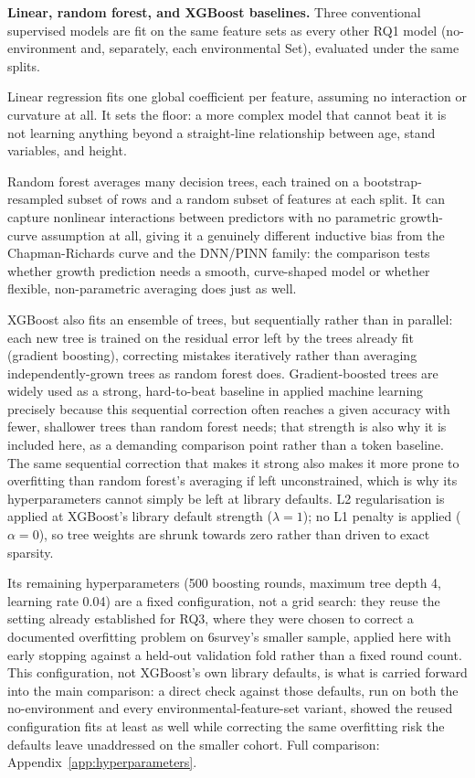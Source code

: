 \documentclass[11pt,a4paper]{report}
\begin{document}
\textbf{Linear, random forest, and XGBoost baselines.} Three conventional supervised models are
fit on the same feature sets as every other RQ1 model (no-environment and, separately, each
environmental Set), evaluated under the same splits.

Linear regression fits one global coefficient per feature, assuming no interaction or curvature at
all. It sets the floor: a more complex model that cannot beat it is not learning anything beyond a
straight-line relationship between age, stand variables, and height.

Random forest averages many decision trees, each trained on a bootstrap-resampled subset of rows
and a random subset of features at each split. It can capture nonlinear interactions between
predictors with no parametric growth-curve assumption at all, giving it a genuinely different
inductive bias from the Chapman-Richards curve and the DNN/PINN family: the comparison tests
whether growth prediction needs a smooth, curve-shaped model or whether flexible, non-parametric
averaging does just as well.

XGBoost also fits an ensemble of trees, but sequentially rather than in parallel: each new tree is
trained on the residual error left by the trees already fit (gradient boosting), correcting
mistakes iteratively rather than averaging independently-grown trees as random forest does.
Gradient-boosted trees are widely used as a strong, hard-to-beat baseline in applied machine
learning precisely because this sequential correction often reaches a given accuracy with fewer,
shallower trees than random forest needs; that strength is also why it is included here, as a
demanding comparison point rather than a token baseline. The same sequential correction that makes
it strong also makes it more prone to overfitting than random forest's averaging if left
unconstrained, which is why its hyperparameters cannot simply be left at library defaults. L2
regularisation is applied at XGBoost's library default strength ($\lambda=1$); no L1 penalty is
applied ($\alpha=0$), so tree weights are shrunk towards zero rather than driven to exact
sparsity.

Its remaining hyperparameters (500 boosting rounds, maximum tree depth 4, learning rate 0.04) are
a fixed configuration, not a grid search: they reuse the setting already established for RQ3,
where they were chosen to correct a documented overfitting problem on 6survey's smaller sample,
applied here with early stopping against a held-out validation fold rather than a fixed round
count. This configuration, not XGBoost's own library defaults, is what is carried forward into the
main comparison: a direct check against those defaults, run on both the no-environment and every
environmental-feature-set variant, showed the reused configuration fits at least as well while
correcting the same overfitting risk the defaults leave unaddressed on the smaller cohort. Full
comparison: Appendix~\ref{app:hyperparameters}.
\end{document}
